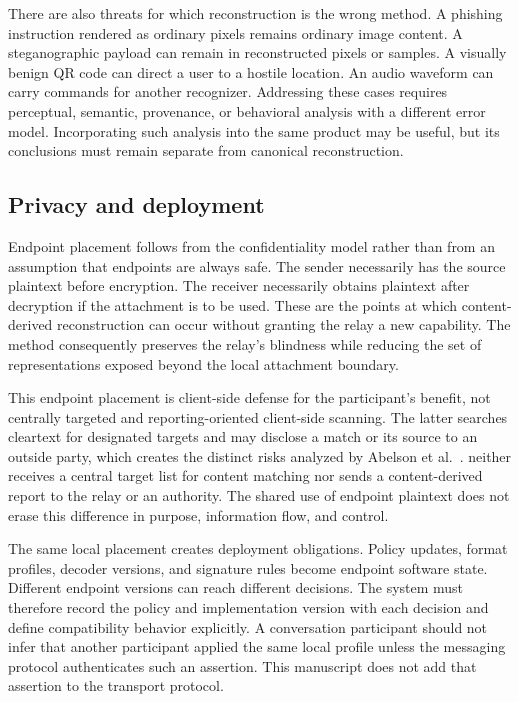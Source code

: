 There are also threats for which reconstruction is the wrong method. A
phishing instruction rendered as ordinary pixels remains ordinary image
content. A steganographic payload can remain in reconstructed pixels or
samples. A visually benign QR code can direct a user to a hostile location.
An audio waveform can carry commands for another recognizer. Addressing these
cases requires perceptual, semantic, provenance, or behavioral analysis with a
different error model. Incorporating such analysis into the same product may
be useful, but its conclusions must remain separate from canonical
reconstruction.

\subsection{Privacy and deployment}

Endpoint placement follows from the confidentiality model rather than from an
assumption that endpoints are always safe. The sender necessarily has the
source plaintext before encryption. The receiver necessarily obtains plaintext
after decryption if the attachment is to be used. These are the points at which
content-derived reconstruction can occur without granting the relay a new
capability. The method consequently preserves the relay's blindness while
reducing the set of representations exposed beyond the local attachment
boundary.

This endpoint placement is client-side defense for the participant's benefit,
not centrally targeted and reporting-oriented client-side scanning. The latter
searches cleartext for designated targets and may disclose a match or its
source to an outside party, which creates the distinct risks analyzed by
Abelson et al.~\cite{abelson2024}. \AFD{} neither receives a central target list
for content matching nor sends a content-derived report to the relay or an
authority. The shared use of endpoint plaintext does not erase this difference
in purpose, information flow, and control.

The same local placement creates deployment obligations. Policy updates,
format profiles, decoder versions, and signature rules become endpoint software
state. Different endpoint versions can reach different decisions. The system
must therefore record the policy and implementation version with each decision
and define compatibility behavior explicitly. A conversation participant
should not infer that another participant applied the same local profile unless
the messaging protocol authenticates such an assertion. This manuscript does
not add that assertion to the transport protocol.

